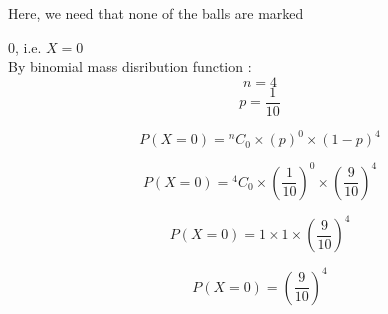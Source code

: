 \documentclass[journal,12pt]{IEEEtran}
\newcommand{\Comb}[2]{{}^{#1}C_{#2}} %
\begin{document}


Here, we need that none of the balls are marked 

0, i.e. $X=0$\\

By binomial mass disribution function :\\


$$ n = 4 $$
$$ p = \frac{1}{10} $$

$$ P(X=0) = \Comb{n}{0} \times (p)^0 \times (1-p)^4 $$

$$ P(X=0) = \Comb{4}{0} \times \left(\frac{1}{10}\right)^0 \times \left(\frac{9}{10}\right)^4 $$

$$ P(X=0) = 1 \times 1\times \left(\frac{9}{10}\right)^4 $$

$$ P(X=0) = \left(\frac{9}{10}\right)^4 $$
\end{document}
